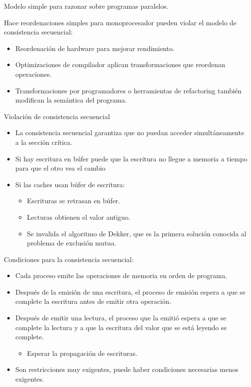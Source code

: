 \documentclass[12pt, twoside, openright]{report} %
\begin{document}
Modelo simple para razonar sobre programas paralelos.

Hace reordenaciones simples para monoprocesador pueden violar el
modelo de consistencia secuencial:

\begin{itemize}

	\item Reordenación de hardware para mejorar rendimiento.
	\item Optimizaciones de compilador aplican transformaciones que
	      reordenan operaciones.
	\item Transformaciones por programadores o herramientas de refactoring
	      también modifican la semántica del programa.
\end{itemize}

Violación de consistencia secuencial

\begin{itemize}

	\item La consistencia secuencial garantiza que no puedan acceder
	      simultáneamente a la sección crítica.
	\item Si hay escritura en búfer puede que la escritura no llegue a
	      memoria a tiempo para que el otro vea el cambio
	\item Si las caches usan búfer de escritura:

	      \begin{itemize}

		      \item Escrituras se retrasan en búfer.
		      \item Lecturas obtienen el valor antiguo.
		      \item Se invalida el algoritmo de Dekker, que es la primera solución
		            conocida al problema de exclusión mutua.
	      \end{itemize}
\end{itemize}

Condiciones para la consistencia secuencial:

\begin{itemize}

	\item Cada proceso emite las operaciones de memoria en orden de
	      programa.
	\item Después de la emisión de una escritura, el proceso de emisión
	      espera a que se complete la escritura antes de emitir otra
	      operación.
	\item Después de emitir una lectura, el proceso que la emitió espera a
	      que se complete la lectura y a que la escritura del valor que se
	      está leyendo se complete.

	      \begin{itemize}

		      \item Esperar la propagación de escrituras.
	      \end{itemize}
	\item Son restricciones muy exigentes, puede haber condiciones
	      necesarias menos exigentes.
\end{itemize}
\end{document}
